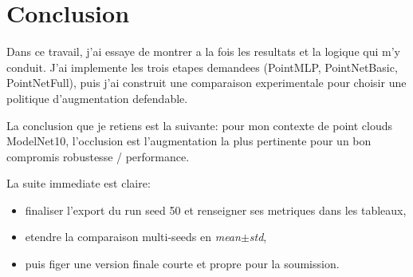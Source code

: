 \chapter{Conclusion}

Dans ce travail, j'ai essaye de montrer a la fois les resultats et la logique qui m'y conduit.
J'ai implemente les trois etapes demandees (PointMLP, PointNetBasic, PointNetFull), puis j'ai construit une comparaison experimentale pour choisir une politique d'augmentation defendable.

La conclusion que je retiens est la suivante: pour mon contexte de point clouds ModelNet10, l'occlusion est l'augmentation la plus pertinente pour un bon compromis robustesse / performance.

La suite immediate est claire:
\begin{itemize}
  \item finaliser l'export du run seed 50 et renseigner ses metriques dans les tableaux,
  \item etendre la comparaison multi-seeds en \emph{mean\(\pm\)std},
  \item puis figer une version finale courte et propre pour la soumission.
\end{itemize}
